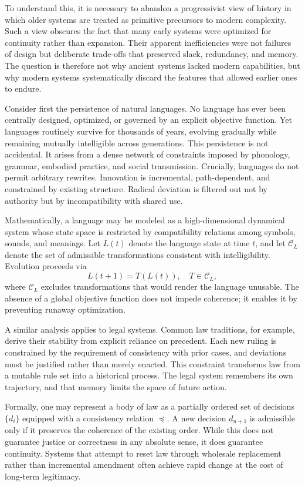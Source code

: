 \documentclass[12pt,oneside]{book}
\begin{document}
To understand this, it is necessary to abandon a progressivist view of history in which older systems are treated as primitive precursors to modern complexity. Such a view obscures the fact that many early systems were optimized for continuity rather than expansion. Their apparent inefficiencies were not failures of design but deliberate trade-offs that preserved slack, redundancy, and memory. The question is therefore not why ancient systems lacked modern capabilities, but why modern systems systematically discard the features that allowed earlier ones to endure.

Consider first the persistence of natural languages. No language has ever been centrally designed, optimized, or governed by an explicit objective function. Yet languages routinely survive for thousands of years, evolving gradually while remaining mutually intelligible across generations. This persistence is not accidental. It arises from a dense network of constraints imposed by phonology, grammar, embodied practice, and social transmission. Crucially, languages do not permit arbitrary rewrites. Innovation is incremental, path-dependent, and constrained by existing structure. Radical deviation is filtered out not by authority but by incompatibility with shared use.

Mathematically, a language may be modeled as a high-dimensional dynamical system whose state space is restricted by compatibility relations among symbols, sounds, and meanings. Let \(L(t)\) denote the language state at time \(t\), and let \(\mathcal{C}_L\) denote the set of admissible transformations consistent with intelligibility. Evolution proceeds via
\[
L(t+1) = T(L(t)), \quad T \in \mathcal{C}_L,
\]
where \(\mathcal{C}_L\) excludes transformations that would render the language unusable. The absence of a global objective function does not impede coherence; it enables it by preventing runaway optimization.

A similar analysis applies to legal systems. Common law traditions, for example, derive their stability from explicit reliance on precedent. Each new ruling is constrained by the requirement of consistency with prior cases, and deviations must be justified rather than merely enacted. This constraint transforms law from a mutable rule set into a historical process. The legal system remembers its own trajectory, and that memory limits the space of future action.

Formally, one may represent a body of law as a partially ordered set of decisions \(\{d_i\}\) equipped with a consistency relation \(\preceq\). A new decision \(d_{n+1}\) is admissible only if it preserves the coherence of the existing order. While this does not guarantee justice or correctness in any absolute sense, it does guarantee continuity. Systems that attempt to reset law through wholesale replacement rather than incremental amendment often achieve rapid change at the cost of long-term legitimacy.
\end{document}
